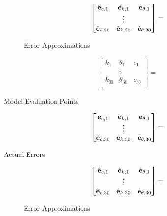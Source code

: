 \documentclass[12pt]{article}
\begin{document}
 \begin{figure}
   \centering
  
   \begin{gather*}
 \begin{bmatrix}
     \hat{\eulerE}_{c,1}&\hat{\eulerE}_{k,1}&\hat{\eulerE}_{\theta,1}\\
 &\vdots\\
     \hat{\eulerE}_{c,30}&\hat{\eulerE}_{k,30}&\hat{\eulerE}_{\theta,30}\\
   \end{bmatrix}=
   
   \end{gather*}
   \caption{Error Approximations\label{esterr}}
 \end{figure}


\begin{table}
  \centering
  
\begin{gather*}
  \begin{bmatrix}
    k_1&\theta_1&\epsilon_1\\
&\vdots\\
    k_{30}&\theta_{30}&\epsilon_{30}\\
  \end{bmatrix}=
  
\end{gather*}

  \caption{Model Evaluation Points \label{evalp}}
\end{table}


 \begin{table}
    \centering
   \begin{gather*}
 \begin{bmatrix}
     \eulerE_{c,1}&\eulerE_{k,1}&\eulerE_{\theta,1}\\
 &\vdots\\
     \eulerE_{c,30}&\eulerE_{k,30}&\eulerE_{\theta,30}\\
   \end{bmatrix}=
  
   \end{gather*}
   \caption{Actual Errors\label{acterr}}
 \end{table}

 \begin{figure}
   \centering
  
   \begin{gather*}
 \begin{bmatrix}
     \hat{\eulerE}_{c,1}&\hat{\eulerE}_{k,1}&\hat{\eulerE}_{\theta,1}\\
 &\vdots\\
     \hat{\eulerE}_{c,30}&\hat{\eulerE}_{k,30}&\hat{\eulerE}_{\theta,30}\\
   \end{bmatrix}=
   
   \end{gather*}
   \caption{Error Approximations\label{esterr}}
 \end{figure}
\end{document}

